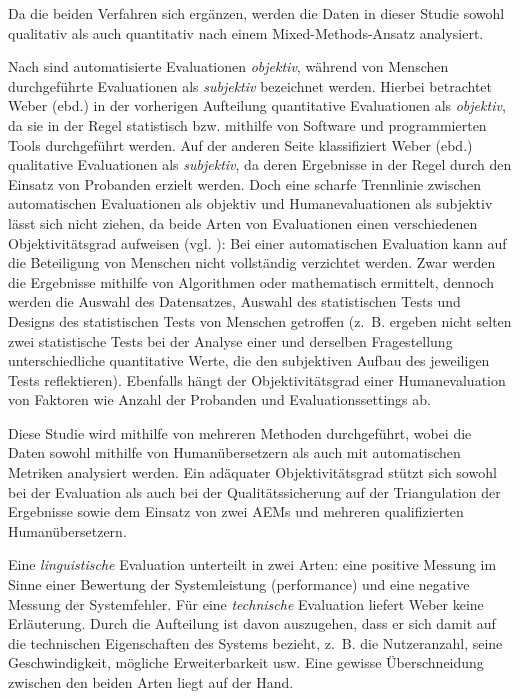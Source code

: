 Da die beiden Verfahren sich ergänzen, werden die Daten in dieser Studie sowohl qualitativ als auch quantitativ nach einem Mixed-Methods-Ansatz analysiert.


Nach \citet[64]{Weber1998} sind automatisierte Evaluationen \textit{objektiv}, während von Menschen durchgeführte Evaluationen als \textit{subjektiv} bezeichnet werden. Hierbei betrachtet Weber (ebd.) in der vorherigen Aufteilung quantitative Evaluationen als \textit{objektiv}, da sie in der Regel statistisch bzw. mithilfe von Software und programmierten Tools durchgeführt werden. Auf der anderen Seite klassifiziert Weber (ebd.) qualitative Evaluationen als \textit{subjektiv}, da deren Ergebnisse in der Regel durch den Einsatz von Probanden erzielt werden. Doch eine scharfe Trennlinie zwischen automatischen Evaluationen als objektiv und Humanevaluationen als subjektiv lässt sich nicht ziehen, da beide Arten von Evaluationen einen verschiedenen Objektivitätsgrad aufweisen (vgl. \citealt{Doherty2017}): Bei einer automatischen Evaluation kann auf die Beteiligung von Menschen nicht vollständig verzichtet werden. Zwar werden die Ergebnisse mithilfe von Algorithmen oder mathematisch ermittelt, dennoch werden die Auswahl des Datensatzes, Auswahl des statistischen Tests und Designs des statistischen Tests von Menschen getroffen (z.~B. ergeben nicht selten zwei statistische Tests bei der Analyse einer und derselben Fragestellung unterschiedliche quantitative Werte, die den subjektiven Aufbau des jeweiligen Tests reflektieren). Ebenfalls hängt der Objektivitätsgrad einer Humanevaluation von Faktoren wie Anzahl der Probanden und Evaluationssettings ab.

Diese Studie wird mithilfe von mehreren Methoden durchgeführt, wobei die Daten sowohl mithilfe von Humanübersetzern als auch mit automatischen Metriken analysiert werden. Ein adäquater Objektivitätsgrad stützt sich sowohl bei der Evaluation als auch bei der Qualitätssicherung auf der Triangulation der Ergebnisse sowie dem Einsatz von zwei AEMs und mehreren qualifizierten Humanübersetzern.


Eine \textit{linguistische} Evaluation unterteilt \citet[64f.]{Weber1998} in zwei Arten: eine positive Messung im Sinne einer Bewertung der Systemleistung (performance) und eine negative Messung der Systemfehler. Für eine \textit{technische} Evaluation liefert Weber keine Erläuterung. Durch die Aufteilung ist davon auszugehen, dass er sich damit auf die technischen Eigenschaften des Systems bezieht, z.~B. die Nutzeranzahl, seine Geschwindigkeit, mögliche Erweiterbarkeit usw. Eine gewisse Überschneidung zwischen den beiden Arten liegt auf der Hand.

